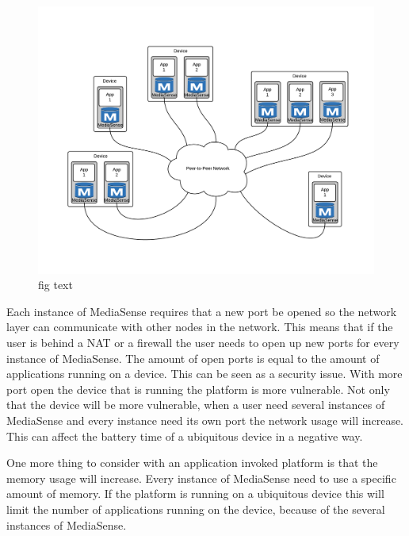 \begin{figure}[t]
	\centering
    	\includegraphics[scale=0.25]{part_2/mediasense/several_nodes_on_one_device.png}
		\caption{fig text} 
\end{figure}

Each instance of MediaSense requires that a new port be opened so the network layer can communicate with other nodes in the network. This means that if the user is behind a NAT or a firewall the user needs to open up new ports for every instance of MediaSense. The amount of open ports is equal to the amount of applications running on a device. This can be seen as a security issue. With more port open the device that is running the platform is more vulnerable. Not only that the device will be more vulnerable, when a user need several instances of MediaSense and every instance need its own port the network usage will increase. This can affect the battery time of a ubiquitous device in a negative way.

One more thing to consider with an application invoked platform is that the memory usage will increase. Every instance of MediaSense need to use a specific amount of memory. If the platform is running on a ubiquitous device this will limit the number of applications running on the device, because of the several instances of MediaSense.

